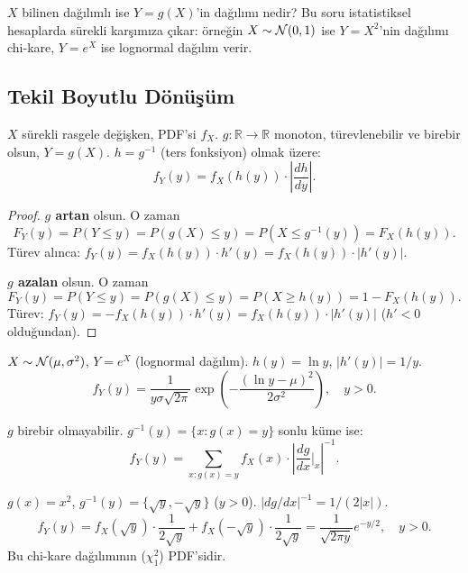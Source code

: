 \begin{motivasyon}
$X$ bilinen dağılımlı ise $Y = g(X)$'in dağılımı nedir?
Bu soru istatistiksel hesaplarda sürekli karşımıza çıkar:
örneğin $X \sim \Normal(0,1)$ ise $Y = X^2$'nin dağılımı chi-kare,
$Y = e^X$ ise lognormal dağılım verir.
\end{motivasyon}

\subsection{Tekil Boyutlu Dönüşüm}
\label{subsec:donusum_1d}

\begin{teorem}
\label{thm:donusum_1d}
$X$ sürekli rasgele değişken, PDF'si $f_X$. $g : \mathbb{R} \to \mathbb{R}$
monoton, türevlenebilir ve birebir olsun, $Y = g(X)$.
$h = g^{-1}$ (ters fonksiyon) olmak üzere:
\[
  f_Y(y) = f_X(h(y)) \cdot \left|\frac{dh}{dy}\right|.
\]
\end{teorem}

\begin{proof}
\textbf{$g$ artan} olsun. O zaman
\[
  F_Y(y) = P(Y \leq y) = P(g(X) \leq y) = P(X \leq g^{-1}(y)) = F_X(h(y)).
\]
Türev alınca: $f_Y(y) = f_X(h(y)) \cdot h'(y) = f_X(h(y)) \cdot |h'(y)|$.

\textbf{$g$ azalan} olsun. O zaman
\[
  F_Y(y) = P(Y \leq y) = P(g(X) \leq y) = P(X \geq h(y)) = 1 - F_X(h(y)).
\]
Türev: $f_Y(y) = -f_X(h(y)) \cdot h'(y) = f_X(h(y)) \cdot |h'(y)|$ ($h' < 0$ olduğundan).
\end{proof}

\begin{ornek}[Lognormal]
$X \sim \mathcal{N}(\mu, \sigma^2)$, $Y = e^X$ (lognormal dağılım).
$h(y) = \ln y$, $|h'(y)| = 1/y$.
\[
  f_Y(y) = \frac{1}{y\sigma\sqrt{2\pi}} \exp\!\left(-\frac{(\ln y - \mu)^2}{2\sigma^2}\right), \quad y > 0.
\]
\end{ornek}

\begin{onerme}
\label{prop:genel_donusum}
$g$ birebir olmayabilir. $g^{-1}(y) = \{x : g(x) = y\}$ sonlu küme ise:
\[
  f_Y(y) = \sum_{x : g(x) = y} f_X(x) \cdot \left|\frac{dg}{dx}\bigg|_{x}\right|^{-1}.
\]
\end{onerme}

\begin{ornek}[$Y = X^2$, $X \sim \Normal(0,1)$]
$g(x) = x^2$, $g^{-1}(y) = \{\sqrt{y}, -\sqrt{y}\}$ ($y > 0$).
$|dg/dx|^{-1} = 1/(2|x|)$.
\[
  f_Y(y) = f_X(\sqrt{y}) \cdot \frac{1}{2\sqrt{y}} + f_X(-\sqrt{y}) \cdot \frac{1}{2\sqrt{y}}
         = \frac{1}{\sqrt{2\pi y}} e^{-y/2}, \quad y > 0.
\]
Bu chi-kare dağılımının ($\chi^2_1$) PDF'sidir.
\end{ornek}

